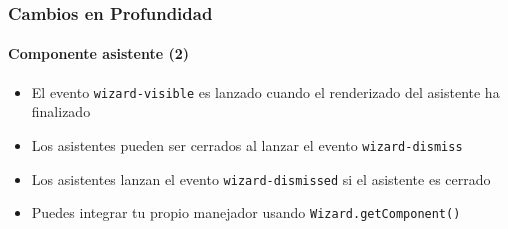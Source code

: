 \begin{frame}[fragile]
	\frametitle{Cambios en Profundidad}
	\framesubtitle{Componente asistente (2)}

	\lstset{basicstyle=\tiny\ttfamily}

	\begin{itemize}

		\item El evento \texttt{wizard-visible} es lanzado cuando el renderizado del asistente ha finalizado

		\item Los asistentes pueden ser cerrados al lanzar el evento \texttt{wizard-dismiss}

		\item Los asistentes lanzan el evento \texttt{wizard-dismissed} si el asistente es cerrado

		\item Puedes integrar tu propio manejador usando \texttt{Wizard.getComponent()}

	\end{itemize}

\end{frame}

